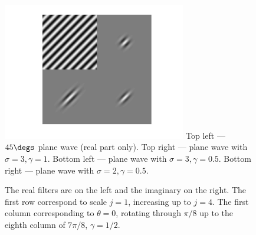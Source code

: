   \begin{figure}
    \begin{center}
      \includegraphics[height=6cm]{litreview/images/morlet_filters.png}
              {Top left --- $45\degs$ plane wave (real part only). Top right --- plane wave with
              $\sigma=3,\gamma=1$. Bottom left --- plane wave with $\sigma=3,\gamma=0.5$. Bottom
            right --- plane wave with $\sigma=2,\gamma=0.5$.}
      \label{fig:ch2:morlet_filters}
    \end{center}
  \end{figure}

  \begin{figure}
    \begin{center}
              {The real filters are on the left and the imaginary on the right. The first row
              correspond to scale $j=1$, increasing up to $j=4$. The first column corresponding to
            $\theta = 0$, rotating through $\pi/8$ up to the eighth column of $7\pi/8$,
          $\gamma=1/2$.} 
      \label{fig:ch2:morlet_wavelets_full}
    \end{center}
  \end{figure}

